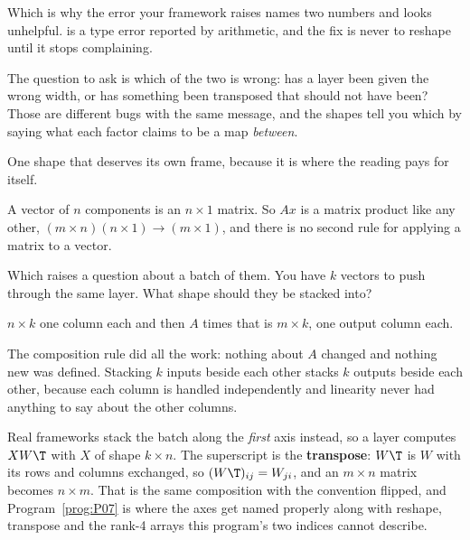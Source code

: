 
\begin{fr}
\begin{aibox}
Which is why the error your framework raises names two numbers and looks
unhelpful.  is a type error reported by arithmetic, and the fix is never to
reshape until it stops complaining.

The question to ask is which of the two is wrong: has a layer been given the
wrong width, or has something been transposed that should not have been?
Those are different bugs with the same message, and the shapes tell you which
by saying what each factor claims to be a map \emph{between}.
\end{aibox}
\end{fr}

\begin{fr}
One shape that deserves its own frame, because it is where the reading pays
for itself.

A vector of $n$ components is an $n \times 1$ matrix. So $Ax$ is a matrix
product like any other, $(m \times n)(n \times 1) \to (m \times 1)$, and there
is no second rule for applying a matrix to a vector.

Which raises a question about a batch of them. You have $k$ vectors to push
through the same layer. What shape should they be stacked into?
\dotline
\nextframe
\end{fr}

\begin{fr}
\begin{ansblock}
$n \times k$ \dash{} one column each \dash{} and then $A$ times that is
$m \times k$, one output column each.
\end{ansblock}

The composition rule did all the work: nothing about $A$ changed and nothing
new was defined. Stacking $k$ inputs beside each other stacks $k$ outputs
beside each other, because each column is handled independently and linearity
never had anything to say about the other columns.

\begin{note}
Real frameworks stack the batch along the \emph{first} axis instead, so a
layer computes $XW\T$ with $X$ of shape $k \times n$. The superscript is the
\textbf{transpose}: $W\T$ is $W$ with its rows and columns exchanged, so
$(W\T)_{ij} = W_{ji}$, and an $m \times n$ matrix becomes $n \times m$. That is
the same composition with the convention flipped, and Program~\ref{prog:P07} is
where the axes get named properly \dash{} along with reshape, transpose and the
rank-4 arrays this program's two indices cannot describe.
\end{note}
\end{fr}

